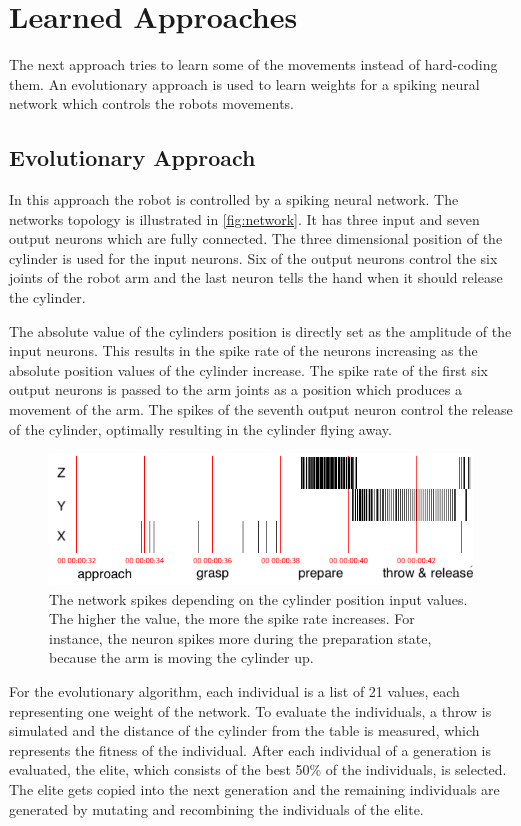 \section{Learned Approaches}
\label{sec:learned}
The next approach tries to learn some of the movements instead of hard-coding them.
An evolutionary approach is used to learn weights for a spiking neural network which controls the robots movements.

\subsection{Evolutionary Approach}
In this approach the robot is controlled by a spiking neural network.
The networks topology is illustrated in \autoref{fig:network}.
It has three input and seven output neurons which are fully connected.
The three dimensional position of the cylinder is used for the input neurons.
Six of the output neurons control the six joints of the robot arm and the last neuron tells the hand when it should release the cylinder.

The absolute value of the cylinders position is directly set as the amplitude of the input neurons.
This results in the spike rate of the neurons increasing as the absolute position values of the cylinder increase.
The spike rate of the first six output neurons is passed to the arm joints as a position which produces a movement of the arm.
The spikes of the seventh output neuron control the release of the cylinder, optimally resulting in the cylinder flying away.

\begin{figure}[h]
\centering
\includegraphics[width=.95\columnwidth]{figures/spike_train.png}
\caption{The network spikes depending on the cylinder position input values. The higher the value, the more the spike rate increases. For instance, the neuron spikes more during the preparation state, because the arm is moving the cylinder up.}
\label{fig:spiketrain}
\end{figure}

For the evolutionary algorithm, each individual is a list of 21 values, each representing one weight of the network.
To evaluate the individuals, a throw is simulated and the distance of the cylinder from the table is measured, which represents the fitness of the individual.
After each individual of a generation is evaluated, the elite, which consists of the best 50\% of the individuals, is selected.
The elite gets copied into the next generation and the remaining individuals are generated by mutating and recombining the individuals of the elite.

